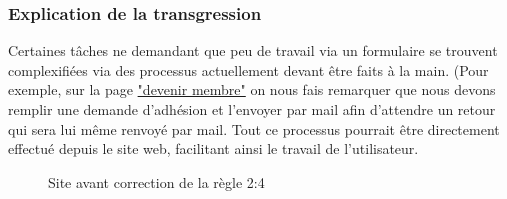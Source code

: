 \documentclass{article}[12pt]
\begin{document}
    \subsubsection*{Explication de la transgression}
    Certaines tâches ne demandant que peu de travail via un formulaire se trouvent complexifiées via des processus actuellement devant être faits à la main. (Pour exemple, sur la page \href{http://www.tennisclubdeparis.fr/formule-adhesion.html}{"devenir membre"} on nous fais remarquer que nous devons remplir une demande d'adhésion et l'envoyer par mail afin d'attendre un retour qui sera lui même renvoyé par mail. Tout ce processus pourrait être directement effectué depuis le site web, facilitant ainsi le travail de l'utilisateur.
     \begin{figure}[H]
    	\centering
        \caption{Site avant correction de la règle 2:4}
    \end{figure}
\end{document}

